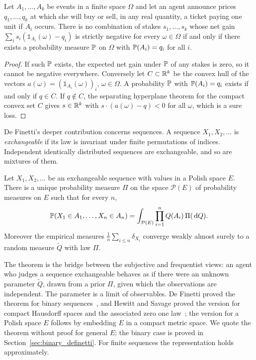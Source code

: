 \begin{theorem}[Coherence]
\label{thm:coherence}
Let $A_1,\dots,A_k$ be events in a finite space $\Omega$ and let an agent announce prices $q_1,\dots,q_k$ at which she will buy or sell, in any real quantity, a ticket paying one unit if $A_i$ occurs. There is no combination of stakes $s_1,\dots,s_k$ whose net gain $\sum_i s_i(\mathbb{1}_{A_i}(\omega)-q_i)$ is strictly negative for every $\omega\in\Omega$ if and only if there exists a probability measure $\P$ on $\Omega$ with $\P(A_i) = q_i$ for all $i$.
\end{theorem}

\begin{proof}
If such $\P$ exists, the expected net gain under $\P$ of any stakes is zero, so it cannot be negative everywhere. Conversely let $C\subset\R^k$ be the convex hull of the vectors $a(\omega) = (\mathbb{1}_{A_i}(\omega))_i$, $\omega\in\Omega$. A probability $\P$ with $\P(A_i) = q_i$ exists if and only if $q\in C$. If $q\notin C$, the separating hyperplane theorem for the compact convex set $C$ gives $s\in\R^k$ with $s\cdot(a(\omega)-q)<0$ for all $\omega$, which is a sure loss.
\end{proof}

De Finetti's deeper contribution concerns sequences. A sequence $X_1,X_2,\dots$ is \emph{exchangeable} if its law is invariant under finite permutations of indices. Independent identically distributed sequences are exchangeable, and so are mixtures of them.

\begin{theorem}
\label{thm:definetti}
Let $X_1,X_2,\dots$ be an exchangeable sequence with values in a Polish space $E$. There is a unique probability measure $\Pi$ on the space $\mathcal{P}(E)$ of probability measures on $E$ such that for every $n$,
\[
\P(X_1\in A_1,\dots,X_n\in A_n) = \int_{\mathcal{P}(E)} \prod_{i=1}^n Q(A_i)\,\Pi(\dd Q).
\]
Moreover the empirical measures $\frac1n\sum_{i\leq n}\delta_{X_i}$ converge weakly almost surely to a random measure $\tilde Q$ with law $\Pi$.
\end{theorem}

The theorem is the bridge between the subjective and frequentist views: an agent who judges a sequence exchangeable behaves as if there were an unknown parameter $\tilde Q$, drawn from a prior $\Pi$, given which the observations are independent. The parameter is a limit of observables. De Finetti proved the theorem for binary sequences~\cite{definetti1937}, and Hewitt and Savage proved the version for compact Hausdorff spaces and the associated zero one law~\cite{hewittsavage1955}; the version for a Polish space $E$ follows by embedding $E$ in a compact metric space. We quote the theorem without proof for general $E$; the binary case is proved in Section~\ref{sec:binary_definetti}. For finite sequences the representation holds approximately.

